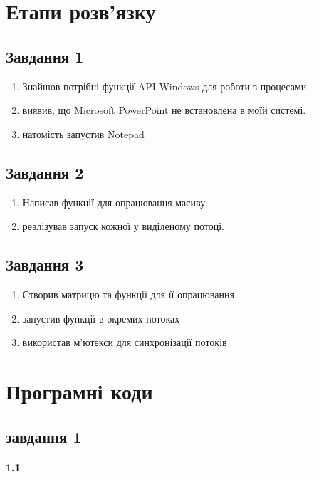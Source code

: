 \documentclass[a4paper, 12pt, oneside]{extarticle}
\begin{document}
\section*{Етапи розв'язку}

\subsection*{Завдання 1}
\begin{enumerate}
	\item Знайшов потрібні функції API Windows для роботи з процесами.
	\item виявив, що Microsoft PowerPoint не встановлена в моїй системі.
	\item натомість запустив Notepad
\end{enumerate}
\subsection*{Завдання 2}
\begin{enumerate}
	\item Написав функції для опрацювання масиву.
	\item реалізував запуск кожної у виділеному потоці.
\end{enumerate}
\subsection*{Завдання 3}
\begin{enumerate}
	\item Створив матрицю та функції для її опрацювання
	\item запустив функції в окремих потоках
	\item використав м'ютекси для синхронізації потоків
\end{enumerate}

\section*{Програмні коди}

\subsection*{завдання 1}
\paragraph{1.1}
\inputminted{c++}{1.1.cpp}
\end{document}

